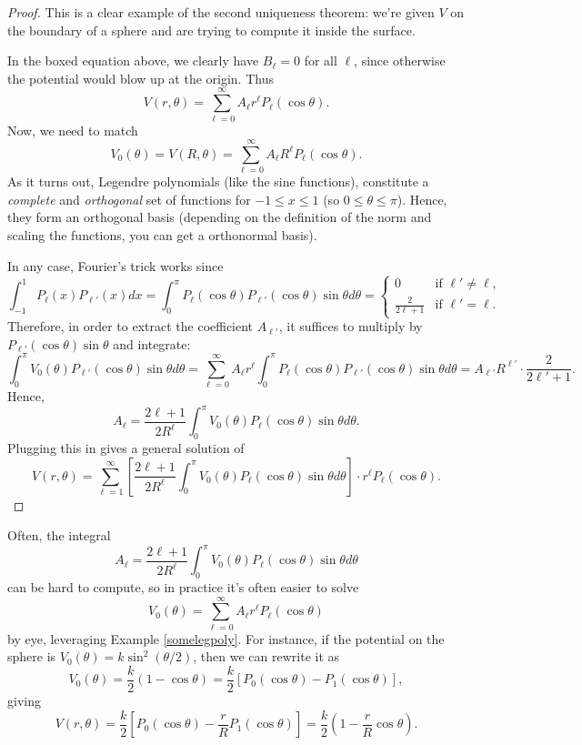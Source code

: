 \begin{proof}
This is a clear example of the second uniqueness theorem: we're given $V$ on the boundary of a sphere and are trying to compute it inside the surface.

In the boxed equation above, we clearly have $B_\ell=0$ for all $\ell$, since otherwise the potential would blow up at the origin. Thus
\[V(r,\theta)=\sum_{\ell=0}^\infty A_\ell r^\ell P_\ell(\cos\theta).\]
Now, we need to match
\[V_0(\theta)=V(R,\theta)=\sum_{\ell=0}^\infty A_\ell R^\ell P_\ell(\cos\theta).\]
As it turns out, Legendre polynomials (like the sine functions), constitute a \textit{complete} and \textit{orthogonal} set of functions for $-1\le x\le 1$ (so $0\le \theta\le \pi$). Hence, they form an orthogonal basis (depending on the definition of the norm and scaling the functions, you can get a orthonormal basis).

In any case, Fourier's trick works since
\[\int_{-1}^1P_\ell(x)P_{\ell'}(x)dx = \int_0^\pi P_\ell(\cos\theta)P_{\ell'}(\cos\theta)\sin\theta d\theta=\begin{cases}
0 & \text{if } \ell'\neq \ell,\\
\frac{2}{2\ell+1} & \text{if }\ell'=\ell.
\end{cases}\]
Therefore, in order to extract the coefficient $A_{\ell'}$, it suffices to multiply by $P_{\ell'}(\cos\theta)\sin\theta$ and integrate:
\[\int_0^\pi V_0(\theta)P_{\ell'}(\cos\theta)\sin\theta d\theta = \sum_{\ell=0}^\infty A_\ell r^\ell\int_0^\pi P_{\ell}(\cos\theta)P_{\ell'}(\cos\theta)\sin\theta d\theta = A_{\ell'}R^{\ell'}\cdot \frac{2}{2\ell'+1}.\]
Hence,
\[A_\ell=\frac{2\ell+1}{2R^\ell}\int_0^\pi V_0(\theta)P_{\ell}(\cos\theta)\sin\theta d\theta.\]
Plugging this in gives a general solution of
\[\boxed{V(r,\theta)=\sum_{\ell=1}^\infty \left[\frac{2\ell+1}{2R^\ell}\int_0^\pi V_0(\theta)P_{\ell}(\cos\theta)\sin\theta d\theta\right]\cdot r^\ell P_\ell(\cos\theta)}.\]
\end{proof}

\begin{remark}
Often, the integral
\[A_\ell=\frac{2\ell+1}{2R^\ell}\int_0^\pi V_0(\theta)P_{\ell}(\cos\theta)\sin\theta d\theta\]
can be hard to compute, so in practice it's often easier to solve
\[V_0(\theta)=\sum_{\ell=0}^\infty A_{\ell}r^\ell P_\ell(\cos\theta)\]
by eye, leveraging Example \ref{somelegpoly}. For instance, if the potential on the sphere is $V_0(\theta)=k\sin^2(\theta/2)$,
then we can rewrite it as
\[V_0(\theta)=\frac{k}{2}(1-\cos\theta)=\frac{k}{2}[P_0(\cos\theta)-P_1(\cos\theta)],\]
giving
\[V(r,\theta)=\frac{k}{2}\left[P_0(\cos\theta)-\frac{r}{R}P_1(\cos\theta)\right]=\frac{k}{2}\left(1-\frac{r}{R}\cos\theta\right).\]
\end{remark}

